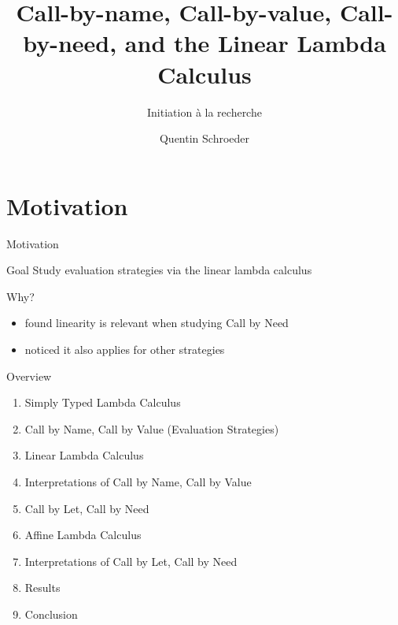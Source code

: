 \documentclass[10pt]{beamer}
\title{Call-by-name, Call-by-value, Call-by-need, and the Linear Lambda Calculus }
\subtitle{Initiation à la recherche}
\date{}
\author{Quentin Schroeder}
\institute{MPRI - Université Paris-Cité}
\begin{document}
\maketitle


\section[Idea]{Motivation}

\begin{frame}[fragile]{Motivation}
  \begin{alertblock}{Goal}
    Study evaluation strategies via the linear lambda calculus
  \end{alertblock}

  \begin{alertblock}{Why?}
    \begin{itemize}
      \item found linearity is relevant when studying Call by Need
      \item noticed it also applies for other strategies
    \end{itemize}
  \end{alertblock}

  \cite{Maraist1995Jan}
\end{frame}

\begin{frame}[fragile]{Overview}
  \begin{enumerate}
    \item Simply Typed Lambda Calculus
    \item Call by Name, Call by Value (Evaluation Strategies)
    \item Linear Lambda Calculus
    \item Interpretations of Call by Name, Call by Value
    \item Call by Let, Call by Need
    \item Affine Lambda Calculus
    \item Interpretations of Call by Let, Call by Need
    \item Results
    \item Conclusion
  \end{enumerate}

\end{frame}
\end{document}
